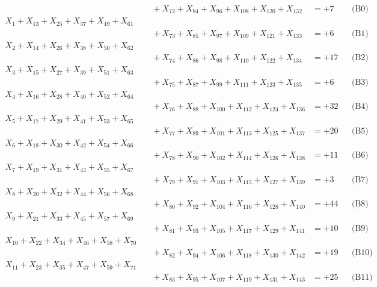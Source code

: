 \documentclass[a4paper,10pt]{article}
\begin{document}
{\begin{align}
&\quad  + X_{72} + X_{84} + X_{96} + X_{108} + X_{120} + X_{132} &= +7 && \text{(B0)} \\
X_{1} + X_{13} + X_{25} + X_{37} + X_{49} + X_{61} \\[0.1ex]
&\quad  + X_{73} + X_{85} + X_{97} + X_{109} + X_{121} + X_{133} &= +6 && \text{(B1)} \\
X_{2} + X_{14} + X_{26} + X_{38} + X_{50} + X_{62} \\[0.1ex]
&\quad  + X_{74} + X_{86} + X_{98} + X_{110} + X_{122} + X_{134} &= +17 && \text{(B2)} \\
\allowbreak
X_{3} + X_{15} + X_{27} + X_{39} + X_{51} + X_{63} \\[0.1ex]
&\quad  + X_{75} + X_{87} + X_{99} + X_{111} + X_{123} + X_{135} &= +6 && \text{(B3)} \\
X_{4} + X_{16} + X_{28} + X_{40} + X_{52} + X_{64} \\[0.1ex]
&\quad  + X_{76} + X_{88} + X_{100} + X_{112} + X_{124} + X_{136} &= +32 && \text{(B4)} \\
X_{5} + X_{17} + X_{29} + X_{41} + X_{53} + X_{65} \\[0.1ex]
&\quad  + X_{77} + X_{89} + X_{101} + X_{113} + X_{125} + X_{137} &= +20 && \text{(B5)} \\
X_{6} + X_{18} + X_{30} + X_{42} + X_{54} + X_{66} \\[0.1ex]
&\quad  + X_{78} + X_{90} + X_{102} + X_{114} + X_{126} + X_{138} &= +11 && \text{(B6)} \\
X_{7} + X_{19} + X_{31} + X_{43} + X_{55} + X_{67} \\[0.1ex]
&\quad  + X_{79} + X_{91} + X_{103} + X_{115} + X_{127} + X_{139} &= +3 && \text{(B7)} \\
\allowbreak
X_{8} + X_{20} + X_{32} + X_{44} + X_{56} + X_{68} \\[0.1ex]
&\quad  + X_{80} + X_{92} + X_{104} + X_{116} + X_{128} + X_{140} &= +44 && \text{(B8)} \\
X_{9} + X_{21} + X_{33} + X_{45} + X_{57} + X_{69} \\[0.1ex]
&\quad  + X_{81} + X_{93} + X_{105} + X_{117} + X_{129} + X_{141} &= +10 && \text{(B9)} \\
X_{10} + X_{22} + X_{34} + X_{46} + X_{58} + X_{70} \\[0.1ex]
&\quad  + X_{82} + X_{94} + X_{106} + X_{118} + X_{130} + X_{142} &= +19 && \text{(B10)} \\
X_{11} + X_{23} + X_{35} + X_{47} + X_{59} + X_{71} \\[0.1ex]
&\quad  + X_{83} + X_{95} + X_{107} + X_{119} + X_{131} + X_{143} &= +25 && \text{(B11)} \\
\end{align}
}
\end{document}
